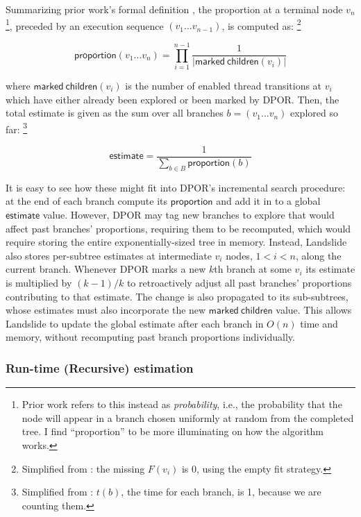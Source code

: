 Summarizing prior work's formal definition \cite{estimation},
the proportion at a terminal node $v_n$%
\footnote{Prior work \cite{estimating-search-tree-size,estimation} refers to this instead as {\em probability},
i.e., the probability that the node will appear in a branch chosen uniformly at random from the completed tree.
I find ``proportion'' to be more illuminating on how the algorithm works.
},
preceded by an execution sequence $(v_1 \dots v_{n-1})$,
is computed as:%
\footnote{
Simplified from \cite{estimation}: the missing $F(v_i)$ is 0, using the empty fit strategy.
}

\[
	\mathsf{proportion}(v_1 \dots v_n) = \displaystyle\prod_{i=1}^{n-1} \frac{1}{|\mathsf{marked~children}(v_i)|}
\]

where $\mathsf{marked~children}(v_i)$ is the number of enabled thread transitions at $v_i$
which have either already been explored or been marked by DPOR.
Then, the total estimate is given as the sum over all branches $b = (v_1 \dots v_n)$ explored so far:%
\footnote{
Simplified from \cite{estimation}: $t(b)$, the time for each branch, is 1, because we are counting them.
}

\[
	\mathsf{estimate} = \frac{1}{\sum_{b \in B} \mathsf{proportion}(b)}
\]

It is easy to see how these might fit into DPOR's incremental search procedure:
at the end of each branch compute its $\mathsf{proportion}$ and add it in to a global $\mathsf{estimate}$ value.
However, DPOR may tag new branches to explore that would affect past branches' proportions,
requiring them to be recomputed,
which would require
storing the entire exponentially-sized tree in memory.
Instead, Landslide also stores per-subtree estimates at intermediate $v_i$ nodes, $1 < i < n$,
along the current branch.
Whenever DPOR marks a new $k$th branch
at some $v_i$
its estimate
is multiplied by $(k-1)/k$ to retroactively adjust all past branches' proportions contributing to that estimate.
The change is also propagated to its sub-subtrees,
whose estimates must also incorporate the new $\mathsf{marked~children}$ value.
This allows Landslide to update the global estimate after each branch in $O(n)$ time and memory,
without recomputing past branch proportions individually.

\subsubsection{Run-time (Recursive) estimation}

